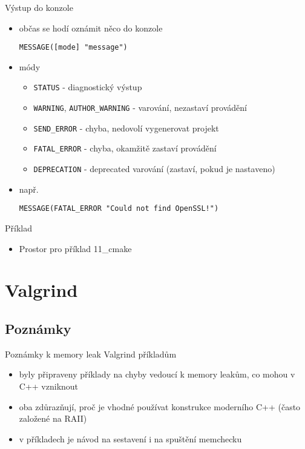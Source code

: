 \documentclass{beamer}
\begin{document}
\begin{xframe}{Výstup do konzole}
	\begin{itemize}
		\item občas se hodí oznámit něco do konzole
\begin{lstlisting}[basicstyle=\fontsize{8}{9}\selectfont\ttfamily]
MESSAGE([mode] "message")
\end{lstlisting}
		\item módy
			\begin{itemize}
				\item \texttt{STATUS} - diagnostický výstup
				\item \texttt{WARNING}, \texttt{AUTHOR\_WARNING} - varování, nezastaví provádění
				\item \texttt{SEND\_ERROR} - chyba, nedovolí vygenerovat projekt
				\item \texttt{FATAL\_ERROR} - chyba, okamžitě zastaví provádění
				\item \texttt{DEPRECATION} - deprecated varování (zastaví, pokud je nastaveno)
			\end{itemize}
		\item např.
\begin{lstlisting}[basicstyle=\fontsize{8}{9}\selectfont\ttfamily]
MESSAGE(FATAL_ERROR "Could not find OpenSSL!")
\end{lstlisting}
	\end{itemize}
\end{xframe}

\begin{xframe}{Příklad}
	\begin{itemize}
		\item Prostor pro příklad 11\_cmake
	\end{itemize}
\end{xframe}

\section{Valgrind}
\subsection{Poznámky}

\begin{xframe}{Poznámky k memory leak Valgrind příkladům}
	\begin{itemize}
		\item byly připraveny příklady na chyby vedoucí k memory leakům, co mohou v C++ vzniknout
		\item oba zdůrazňují, proč je vhodné používat konstrukce moderního C++ (často založené na RAII)
		\item v příkladech je návod na sestavení i na spuštění memchecku
	\end{itemize}
\end{xframe}
\end{document}
